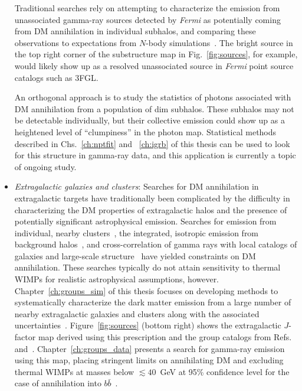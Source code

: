 \begin{itemize}
Traditional searches rely on attempting to characterize the emission from unassociated gamma-ray sources detected by \emph{Fermi} as potentially coming from DM annihilation in individual subhalos, and comparing these observations to expectations from $N$-body simulations~\cite{Bertoni:2015mla,Calore:2016ogv,Hooper:2016cld,Schoonenberg:2016aml}. The bright source in the top right corner of the substructure map in Fig.~\ref{fig:sources}, for example, would likely show up as a resolved unassociated source in \emph{Fermi} point source catalogs such as 3FGL.

An orthogonal approach is to study the statistics of photons associated with DM annihilation from a population of dim subhalos. These subhalos may not be detectable individually, but their collective emission could show up as a heightened level of ``clumpiness'' in the photon map. Statistical methods described in Chs.~\ref{ch:nptfit} and ~\ref{ch:igrb} of this thesis can be used to look for this structure in gamma-ray data, and this application is currently a topic of ongoing study.

\item \emph{Extragalactic galaxies and clusters}: Searches for DM annihilation in extragalactic targets have traditionally been complicated by the difficulty in characterizing the DM properties of extragalactic halos and the presence of potentially significant astrophysical emission. Searches for emission from individual, nearby clusters~\cite{Ackermann:2015fdi}, the integrated, isotropic emission from background halos~\cite{Ackermann:2015tah,Ajello:2015mfa,Cholis:2013ena,DiMauro:2015tfa}, and cross-correlation of gamma rays with local catalogs of galaxies and large-scale structure~\cite{Ando:2013xwa,Ando:2014aoa,Ando:2016ang,Cuoco:2015rfa,Regis:2015zka,Xia:2015wka} have yielded constraints on DM annihilation. These searches typically do not attain sensitivity to thermal WIMPs for realistic astrophysical assumptions, however. Chapter~\ref{ch:groups_sim} of this thesis focuses on developing methods to systematically characterize the dark matter emission from a large number of nearby extragalactic galaxies and clusters along with the associated uncertainties~\cite{Lisanti:2017qoz}. Figure~\ref{fig:sources} (bottom right) shows the extragalactic $J$-factor map derived using this prescription and the group catalogs from Refs.~\cite{Tully:2015opa} and~\cite{2017ApJ...843...16K}. Chapter~\ref{ch:groups_data} presents a search for gamma-ray emission using this map, placing stringent limits on annihilating DM and excluding thermal WIMPs at masses below $\lesssim 40$~GeV at 95\% confidence level for the case of annihilation into $b\bar b$~\cite{Lisanti:2017qlb}.
\end{itemize}

